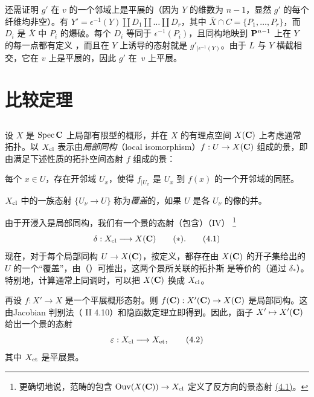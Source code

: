 还需证明 $g'$ 在 $v$ 的一个邻域上是平展的（因为 $Y$ 的维数为 $n-1$，显然 $g'$ 的每个纤维均非空）。有 $Y'=\epsilon^{-1}(Y)\amalg D_1\amalg\ldots \amalg D_r$，其中 $\bar{X}\cap C=\{P_1,\ldots,P_r\}$，而 $D_i$ 是 $\bar{X}$ 中 $P_i$ 的爆破\pageoriginale。每个 $D_i$ 等同于 $\epsilon^{-1}(P_i)$，且同构地映到 $\mathbf{P}^{n-1}$ 上在 $Y$ 的每一点都有定义%
，而且在 $Y$ 上诱导的态射就是 $g'_{\mid \epsilon^{-1}(Y)}$。由于 $L$ 与 $Y$ 横截相交，它在 $v$ 上是平展的，因此 $g'$ 在~$v$ 上平展。


\section{比较定理}

\setcounter{subsection}{-1}
\subsection{}
设 $X$ 是 $\operatorname{Spec} \mathbf{C}$ 上局部有限型的概形，并在 $X$ 的有理点空间 $X(\mathbf{C})$ 上考虑通常拓扑。以 $X_{\operatorname{cl}}$ 表示由\emph{局部同构}（local isomorphism）$f:U\rightarrow X(\mathbf{C})$ 组成的景，即由满足下述性质的拓扑空间态射 $f$ 组成的景：

每个 $x\in U$，存在开邻域 $U_x$，使得 $f_{\mid U_x}$ 是 $U_x$ 到 $f(x)$ 的一个开邻域的同胚。

$X_{\operatorname{cl}}$ 中的一族态射 $\{U_{\nu}\rightarrow U\}$ 称为\emph{覆盖}的，如果 $U$ 是各 $U_{\nu}$ 的像的并。

由于开浸入是局部同构，我们有一个景的态射（包含）（IV\quad ） %
\footnote{更确切地说，范畴的包含 $\operatorname{Ouv}(X(\mathbf{C}))\rightarrow X_{\operatorname{cl}}$ 定义了反方向的景态射 \hyperref[XI.eq4.1]{(4.1)}。}
\begin{equation*}
\delta:X_{\operatorname{cl}}\longrightarrow X(\mathbf{C})\qquad
(\ast){}.\tag{4.1}
\end{equation*}
现在，对于每个局部同构 $U\rightarrow X(\mathbf{C})$，按定义，都存在由 $X(\mathbf{C})$ 的开子集给出的 $U$ 的一个“覆盖”，由（\quad ）可推出，这两个景所关联的拓扑斯 %
是等价的（通过 $\delta_{\ast}$）。特别地，计算通常上同调时，可以把 $X(\mathbf{C})$ 换成 $X_{\operatorname{cl}}$。

再设 $f:X'\rightarrow X$ 是一个平展概形态射。则 $f(\mathbf{C}):X'(\mathbf{C})\rightarrow X(\mathbf{C})$ 是局部同构。这由\pageoriginale Jacobian 判别法（ II 4.10）和隐函数定理立即得到。因此，函子 $X'\mapsto X'(\mathbf{C})$ 给出一个景的态射
\begin{equation*}
\varepsilon:X_{\operatorname{cl}}\longrightarrow X_{\mathrm{et}}{},\tag{4.2}
\end{equation*}
其中 $X_{\mathrm{et}}$ 是平展景。

